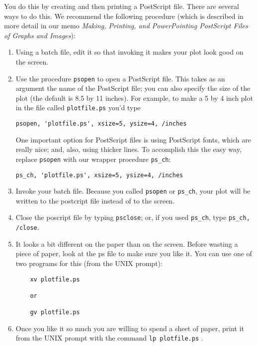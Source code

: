 \documentclass[psfig,preprint]{aastex}
\begin{document}
You do this by creating and then printing a PostScript file.  There are
several ways to do this.  We recommend the following procedure (which is
described in more detail in our memo {\it Making, Printing, and
  PowerPointing PostScript Files of Graphs and Images}): \begin{enumerate}

	\item Using a batch file, edit it so that invoking it makes
your plot look good on the screen. 

	\item Use the procedure \verb$psopen$ to open a PostScript file.
This takes as an argument the name of the PostScript file; you can also
specify the size of the plot (the default is 8.5 by 11 inches). For
example, to make a 5 by 4 inch plot in the file called
\verb$plotfile.ps$ you'd type
\begin{verbatim}
psopen, 'plotfile.ps', xsize=5, ysize=4, /inches
\end{verbatim}

\noindent One important option for PostScript files is using PostScript
fonts, which are really nice; and, also, using thicker lines. To
accomplish this the easy way, replace {\tt psopen} with our wrapper
procedure {\tt ps\_ch}:
\begin{verbatim}
ps_ch, 'plotfile.ps', xsize=5, ysize=4, /inches
\end{verbatim}

\item Invoke your batch file. Because you called
\verb$psopen$ or {\tt ps\_ch}, your plot will be written to the
postcript file instead of to the screen.

	\item Close the poscript file by typing \verb$psclose$; or, if
	you used {\tt ps\_ch}, type {\tt ps\_ch, /close}.

	\item It looks a bit different on the paper than on the screen. 
Before wasting a piece of paper, look at the ps file to make sure you
like it.  You can use one of two programs for this (from the UNIX
prompt):
\begin{verbatim}
	xv plotfile.ps

	or

	gv plotfile.ps
\end{verbatim}

	\item Once you like it so much you are willing to spend a sheet of paper,
print it from the UNIX prompt with the command \verb$lp plotfile.ps$ .
\end{enumerate}
\end{document}
